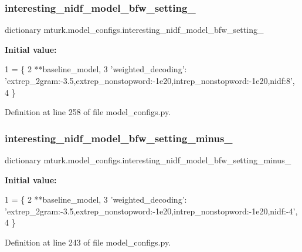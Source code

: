 \subsubsection{\texorpdfstring{interesting\+\_\+nidf\+\_\+model\+\_\+bfw\+\_\+setting\+\_}{interesting\_nidf\_model\_bfw\_setting\_08}}
{\footnotesize\ttfamily dictionary mturk.\+model\+\_\+configs.\+interesting\+\_\+nidf\+\_\+model\+\_\+bfw\+\_\+setting\+\_}

{\bfseries Initial value\+:}
\begin{DoxyCode}
1 =  \{
2     **baseline\_model,
3     \textcolor{stringliteral}{'weighted\_decoding'}: \textcolor{stringliteral}{'extrep\_2gram:-3.5,extrep\_nonstopword:-1e20,intrep\_nonstopword:-1e20,nidf:8'},
4 \}
\end{DoxyCode}


Definition at line 258 of file model\+\_\+configs.\+py.

\mbox{\label{namespacemturk_1_1model__configs_a1980ec7eac9393e23168e215731f1597}} 
\subsubsection{\texorpdfstring{interesting\+\_\+nidf\+\_\+model\+\_\+bfw\+\_\+setting\+\_\+minus\+\_}{interesting\_nidf\_model\_bfw\_setting\_minus\_04}}
{\footnotesize\ttfamily dictionary mturk.\+model\+\_\+configs.\+interesting\+\_\+nidf\+\_\+model\+\_\+bfw\+\_\+setting\+\_\+minus\+\_}

{\bfseries Initial value\+:}
\begin{DoxyCode}
1 =  \{
2     **baseline\_model,
3     \textcolor{stringliteral}{'weighted\_decoding'}: \textcolor{stringliteral}{'extrep\_2gram:-3.5,extrep\_nonstopword:-1e20,intrep\_nonstopword:-1e20,nidf:-4'},
4 \}
\end{DoxyCode}


Definition at line 243 of file model\+\_\+configs.\+py.

\mbox{\label{namespacemturk_1_1model__configs_a2e95536bddece884daf708e72dcbd8ac}} 
